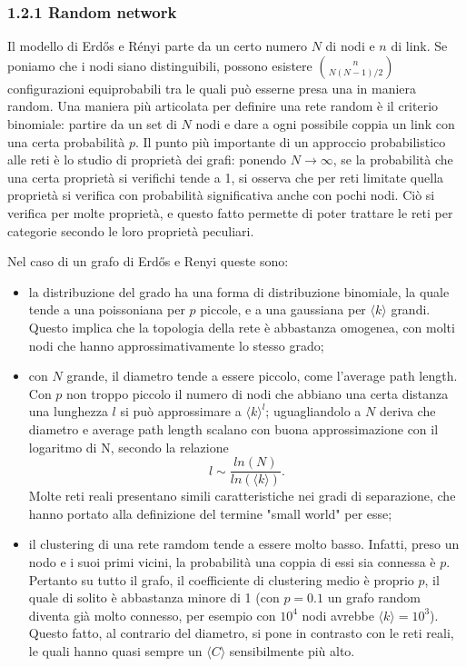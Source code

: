 \subsubsection{1.2.1 Random network}
Il modello di Erdős e Rényi parte da un certo numero $N$ di nodi e $n$ di link. Se poniamo che i nodi siano distinguibili, possono esistere $\binom{n}{N(N-1)/2}$ 
configurazioni equiprobabili tra le quali può esserne presa una in maniera random. Una maniera più articolata per definire una rete random è il criterio binomiale: partire da un set di $N$ nodi e dare a ogni possibile coppia un link con una certa probabilità  $p$. 
Il punto più importante di un approccio probabilistico alle reti è lo studio di proprietà dei grafi: ponendo $N \rightarrow \infty$, se la probabilità che una certa proprietà si verifichi tende a 1, si osserva che per reti limitate quella proprietà si verifica con probabilità significativa anche con pochi nodi. Ciò si verifica per molte proprietà, e questo fatto permette di poter trattare le reti per categorie secondo le loro proprietà peculiari.

Nel caso di un grafo di Erdős e Renyi queste sono:

\begin{itemize}
	\item la distribuzione del grado ha una forma di distribuzione binomiale, la quale tende a una poissoniana per $p$ piccole, e a una gaussiana per $\langle k \rangle$ grandi. Questo implica che la topologia della rete è abbastanza omogenea, con molti nodi che hanno approssimativamente lo stesso grado;
	
	\item con $N$ grande, il diametro tende a essere piccolo, come l'average path length. Con $p$ non troppo piccolo il numero di nodi che abbiano una certa distanza una lunghezza $l$ si può approssimare a $\langle k\rangle^l$; uguagliandolo a $N$ deriva che diametro e average path length scalano con buona approssimazione con il logaritmo di N, secondo la relazione
	\begin{equation}
	\label{eq:lunghezze}
	l \sim \frac{ln(N)}{ln(\langle k \rangle)}. 	 
	\end{equation}
	Molte reti reali presentano simili caratteristiche nei gradi di separazione, che hanno portato alla definizione del termine "small world" per esse;
	
	\item il clustering di una rete ramdom tende a essere molto basso. Infatti, preso un nodo e i suoi primi vicini, la probabilità una coppia di essi sia connessa è $p$. Pertanto su tutto il grafo, il coefficiente di clustering medio è proprio $p$, il quale di solito è abbastanza minore di 1 (con $p = 0.1$ un grafo random diventa già molto connesso, per esempio con $10^4$ nodi avrebbe $\langle k\rangle = 10^3$). Questo fatto, al contrario del diametro, si pone in contrasto con le reti reali, le quali hanno quasi sempre un $\langle C \rangle$ sensibilmente più alto.
\end{itemize}

